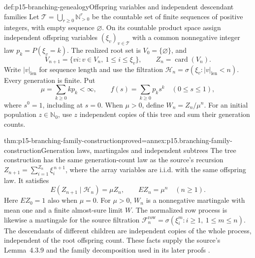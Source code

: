 \begin{hbdefinition}{def:p15-branching-genealogy}{Offspring variables and independent descendant families}
Let \(\mathcal T=\bigcup_{r\geq0}\mathbb N_{>0}^r\) be the countable
set of finite sequences of positive integers, with empty sequence
\(\varnothing\). On its countable product space assign independent
offspring variables \((\xi_v)_{v\in\mathcal T}\) with a common
nonnegative integer law \(p_k=P(\xi_v=k)\).
The realized root set is \(V_0=\{\varnothing\}\), and
\[
              V_{n+1}=\{vi:v\in V_n,\ 1\leq i\leq\xi_v\},
              \qquad Z_n=\operatorname{card}(V_n).
\]
Write \(|v|_{\mathrm{len}}\) for sequence length and use the filtration
\(\mathcal H_n=\sigma(\xi_v:|v|_{\mathrm{len}}<n)\).
Every generation is finite. Put
\[
              \mu=\sum_{k\geq0}kp_k<\infty,\qquad
              f(s)=\sum_{k\geq0}p_ks^k\quad(0\leq s\leq1),
\]
where \(s^0=1\), including at \(s=0\).
When \(\mu>0\), define \(W_n=Z_n/\mu^n\).
For an initial population \(z\in\mathbb N_0\), use \(z\) independent
copies of this tree and sum their generation counts.
\end{hbdefinition}

\begin{hbtheorem}{thm:p15-branching-family-construction}{proved=annex:p15.branching-family-construction}{Generation laws, martingales and independent subtrees}
The tree construction has the same generation-count law as the source's
recursion \(Z_{n+1}=\sum_{i=1}^{Z_n}\xi_i^{\,n+1}\), where the
array variables are i.i.d. with the same offspring law. It satisfies
\[
                 E(Z_{n+1}\mid\mathcal H_n)=\mu Z_n,\qquad
                 EZ_n=\mu^n\quad(n\geq1).
\]
Here \(EZ_0=1\) also when \(\mu=0\).
For \(\mu>0\), \(W_n\) is a nonnegative martingale with mean one
and a finite almost-sure limit \(W\).
The normalized row process is likewise a martingale for the source
filtration \(\mathcal F_n^{\mathrm{row}}
=\sigma(\xi_i^m:i\geq1,\ 1\leq m\leq n)\).
The descendants of different children are independent copies of the
whole process, independent of the root offspring count.
These facts supply the source's Lemma~4.3.9 and the family decomposition
used in its later proofs \cite[pp.~230--232]{DurrettPTEAuthor2019}.
\end{hbtheorem}

